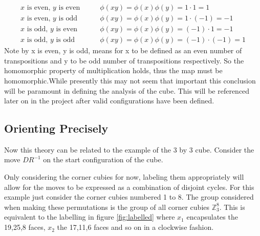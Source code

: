 \documentclass{article}
\newcounter{theo}[section]\setcounter{theo}{0}
\newcounter{prop}[section]\setcounter{prop}{0}
\begin{document}
\begin{align*}
\text{$x$ is even, $y$ is even} \qquad	&\phi(xy) = \phi(x)\phi(y) = 1\cdot1 = 1\\
\text{$x$ is even, $y$ is odd} \qquad	&\phi(xy) = \phi(x)\phi(y)= 1\cdot(-1) = -1\\
\text{$x$ is odd, $y$ is even} \qquad	&\phi(xy) = \phi(x)\phi(y)= (-1)\cdot1 = -1\\
\text{$x$ is odd, $y$ is odd} \qquad	&\phi(xy) = \phi(x)\phi(y) = (-1)\cdot(-1) = 1
\end{align*}
Note by x is even, y is odd, means for x to be defined as an even number of transpositions and y to be odd number of transpositions respectively. So the homomorphic property of multiplication holds, thus the map must be homomorphic.\newline While presently this may not seem that important this conclusion will be paramount in defining the analysis of the cube. This will be referenced later on in the project after valid configurations have been defined.


\newpage
\subsection{Orienting Precisely}

Now this theory can be related to the example of the 3 by 3 cube. Consider the move $DR^{-1}$ on the start configuration of the cube.


\begin{figure}[hbt]
\centering%
  \RubikCubeSolved%
    \hspace{.4cm}
    \quad{}%
    \hspace{.4cm}
  	\hspace{.4cm}
    \quad{}%
    \hspace{.4cm}
\end{figure}
Only considering the corner cubies for now, labeling them appropriately will allow for the moves to be expressed as a combination of disjoint cycles. For this example just consider the corner cubies numbered 1 to 8. The group considered when making these permutations is the group of all corner cubies $\mathbb{Z}_{3}^{8}$. This is equivalent to the labelling in figure \ref{fig:labelled} where $x_1$ encapsulates the 19,25,8 faces, $x_2$ the 17,11,6 faces and so on in a clockwise fashion.
\end{document}
